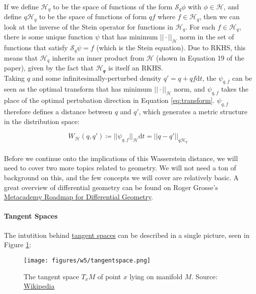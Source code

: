 \documentclass[12pt]{article}
\begin{document}
\noindent If we define $\mathcal{H}_q$ to be the space of functions of the form $\mathcal{S}_q\phi$ with $\phi \in \mathcal{H}$, and define $q\mathcal{H}_q$ to be the space of functions of form $qf$ where $f \in \mathcal{H}_q$, then we can look at the inverse of the Stein operator for functions in $\mathcal{H}_q$. For each $f \in \mathcal{H}_q$, there is some unique function $\psi$ that has minimum $||\cdot||_\mathcal{H}$ norm in the set of functions that satisfy $\mathcal{S}_q\psi = f$ (which is the Stein equation). Due to RKHS, this means that $\mathcal{H}_q$ inherits an inner product from $\mathcal{H}$ (shown in Equation 19 of the paper), given by the fact that $\mathcal{H_q}$ is itself an RKHS.
\\

\noindent Taking $q$ and some infinitesimally-perturbed density $q' = q + qf\text{d}t$, the $\psi_{q, f}$ can be seen as the optimal transform that has minimum $|| \cdot ||_\mathcal{H}$ norm, and $\psi_{q, f}$ takes the place of the optimal pertubation direction in Equation \ref{eq:transform}. $\psi_{q, f}$ therefore defines a distance between $q$ and $q'$, which generates a metric structure in the distribution space:

\begin{equation}
    W_\mathcal{H}(q, q') \coloneqq ||\psi_{q, f}||_\mathcal{H}\text{d}t = ||q - q'||_{q\mathcal{H}_q}
    \label{eq:wassq}
\end{equation}
\\

\noindent Before we continue onto the implications of this Wasserstein distance, we will need to cover two more topics related to geometry. We will not need a ton of background on this, and the few concepts we will cover are relatively basic. A great overview of differential geometry can be found on Roger Grosse's \href{https://metacademy.org/roadmaps/rgrosse/dgml}{Metacademy Roadmap for Differential Geometry}. \\

\paragraph{Tangent Spaces} The intutition behind \href{https://en.wikipedia.org/wiki/Tangent_space}{tangent spaces} can be described in a single picture, seen in Figure \ref{fig:tangentspace}: \\

\begin{figure}[h!]
    \centering
    \texttt{[image: figures/w5/tangentspace.png]}
    \caption{The tangent space $T_xM$ of point $x$ lying on manifold $M$. Source: \href{https://en.wikipedia.org/wiki/Tangent_space}{Wikipedia}}
    \label{fig:tangentspace}
\end{figure}
\end{document}
